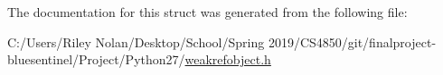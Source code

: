 The documentation for this struct was generated from the following file\+:\begin{DoxyCompactItemize}
\item 
C\+:/\+Users/\+Riley Nolan/\+Desktop/\+School/\+Spring 2019/\+C\+S4850/git/finalproject-\/bluesentinel/\+Project/\+Python27/\mbox{\hyperlink{weakrefobject_8h}{weakrefobject.\+h}}\end{DoxyCompactItemize}
